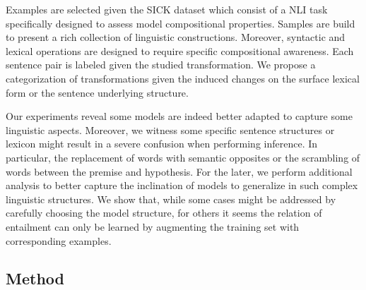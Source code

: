 Examples are selected given the SICK dataset \parencite{marelli_14} which consist of a NLI task specifically designed to assess model compositional properties. Samples are build to present a rich collection of linguistic constructions. Moreover, syntactic and lexical operations are designed to require specific compositional awareness. Each sentence pair is labeled given the studied transformation. We propose a categorization of transformations given the induced changes on the surface lexical form or the sentence underlying structure. 


Our experiments reveal some models are indeed better adapted to capture some linguistic aspects. Moreover, we witness some specific sentence structures or lexicon might result in a severe confusion when performing inference. In particular, the replacement of words with semantic opposites or the scrambling of words between the premise and hypothesis. For the later, we perform additional analysis to better capture the inclination of models to generalize in such complex linguistic structures. We show that, while some cases might be addressed by carefully choosing the model structure, for others it seems the relation of entailment can only be learned by augmenting the training set with corresponding examples.

\subsection{Method}



